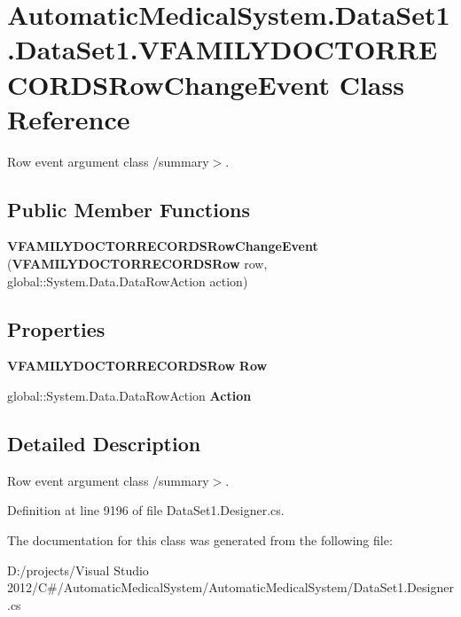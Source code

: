 \section{AutomaticMedicalSystem.DataSet1.DataSet1.VFAMILYDOCTORRECORDSRowChangeEvent Class Reference}
\label{class_automatic_medical_system_1_1_data_set1_1_1_v_f_a_m_i_l_y_d_o_c_t_o_r_r_e_c_o_r_d_s_row_change_event}
Row event argument class /summary$>$.  


\subsection*{Public Member Functions}
\begin{CompactItemize}
\item 
\textbf{VFAMILYDOCTORRECORDSRowChangeEvent} ({\bf VFAMILYDOCTORRECORDSRow} row, global::System.Data.DataRowAction action)\label{class_automatic_medical_system_1_1_data_set1_1_1_v_f_a_m_i_l_y_d_o_c_t_o_r_r_e_c_o_r_d_s_row_change_event_572c879ffe0aafa962f6c229e099082a}

\end{CompactItemize}
\subsection*{Properties}
\begin{CompactItemize}
\item 
{\bf VFAMILYDOCTORRECORDSRow} \textbf{Row}\hspace{0.3cm}{\tt  [get]}\label{class_automatic_medical_system_1_1_data_set1_1_1_v_f_a_m_i_l_y_d_o_c_t_o_r_r_e_c_o_r_d_s_row_change_event_ec601473a0f017ad7a3af256210366cd}

\item 
global::System.Data.DataRowAction \textbf{Action}\hspace{0.3cm}{\tt  [get]}\label{class_automatic_medical_system_1_1_data_set1_1_1_v_f_a_m_i_l_y_d_o_c_t_o_r_r_e_c_o_r_d_s_row_change_event_3a6cb77acb3b29f455396d535da61f41}

\end{CompactItemize}


\subsection{Detailed Description}
Row event argument class /summary$>$. 

Definition at line 9196 of file DataSet1.Designer.cs.

The documentation for this class was generated from the following file:\begin{CompactItemize}
\item 
D:/projects/Visual Studio 2012/C\#/AutomaticMedicalSystem/AutomaticMedicalSystem/DataSet1.Designer.cs\end{CompactItemize}

